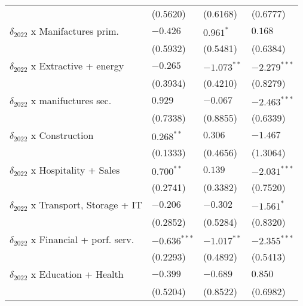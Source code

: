 \begin{tabular}{llll}
                                                   &           (0.5620) &           (0.6168) &           (0.6777) \\
$\delta_{2022}$ x Manifactures prim.               &           $-0.426$ &          $0.961^*$ &            $0.168$ \\
                                                   &           (0.5932) &           (0.5481) &           (0.6384) \\
$\delta_{2022}$ x Extractive + energy              &           $-0.265$ &      $-1.073^{**}$ &     $-2.279^{***}$ \\
                                                   &           (0.3934) &           (0.4210) &           (0.8279) \\
$\delta_{2022}$ x manifuctures sec.                &            $0.929$ &           $-0.067$ &     $-2.463^{***}$ \\
                                                   &           (0.7338) &           (0.8855) &           (0.6339) \\
$\delta_{2022}$ x Construction                     &       $0.268^{**}$ &            $0.306$ &           $-1.467$ \\
                                                   &           (0.1333) &           (0.4656) &           (1.3064) \\
$\delta_{2022}$ x Hospitality + Sales              &       $0.700^{**}$ &            $0.139$ &     $-2.031^{***}$ \\
                                                   &           (0.2741) &           (0.3382) &           (0.7520) \\
$\delta_{2022}$ x Transport, Storage + IT          &           $-0.206$ &           $-0.302$ &         $-1.561^*$ \\
                                                   &           (0.2852) &           (0.5284) &           (0.8320) \\
$\delta_{2022}$ x Financial + porf. serv.          &     $-0.636^{***}$ &      $-1.017^{**}$ &     $-2.355^{***}$ \\
                                                   &           (0.2293) &           (0.4892) &           (0.5413) \\
$\delta_{2022}$ x Education + Health               &           $-0.399$ &           $-0.689$ &            $0.850$ \\
                                                   &           (0.5204) &           (0.8522) &           (0.6982) \\

\end{tabular}
